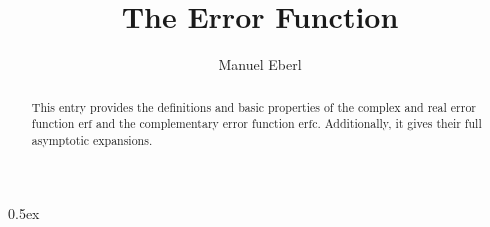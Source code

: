 \documentclass[11pt,a4paper]{article}
\begin{document}
\title{The Error Function}
\author{Manuel Eberl}
\maketitle

\begin{abstract}
This entry provides the definitions and basic properties of the complex and real error function $\text{erf}$ and the complementary error function $\text{erfc}$. Additionally, it gives their full asymptotic expansions.
\end{abstract}

\tableofcontents
\newpage
\parindent 0pt\parskip 0.5ex





\end{document}
